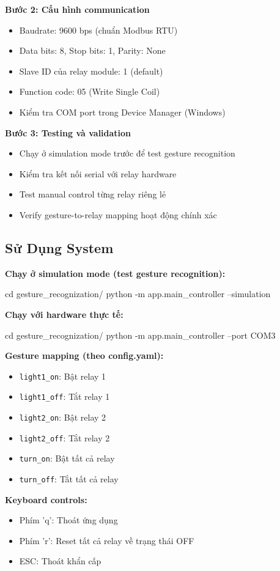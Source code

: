 \textbf{Bước 2: Cấu hình communication}
\begin{itemize}
    \item Baudrate: 9600 bps (chuẩn Modbus RTU)
    \item Data bits: 8, Stop bits: 1, Parity: None
    \item Slave ID của relay module: 1 (default)
    \item Function code: 05 (Write Single Coil)
    \item Kiểm tra COM port trong Device Manager (Windows)
\end{itemize}

\textbf{Bước 3: Testing và validation}
\begin{itemize}
    \item Chạy ở simulation mode trước để test gesture recognition
    \item Kiểm tra kết nối serial với relay hardware
    \item Test manual control từng relay riêng lẻ
    \item Verify gesture-to-relay mapping hoạt động chính xác
\end{itemize}

\subsection{Sử Dụng System}

\textbf{Chạy ở simulation mode (test gesture recognition):}
\begin{aivncodebox}
\begin{python}
cd gesture_recognization/
python -m app.main_controller --simulation
\end{python}
\end{aivncodebox}

\textbf{Chạy với hardware thực tế:}
\begin{aivncodebox}
\begin{python}
cd gesture_recognization/
python -m app.main_controller --port COM3
\end{python}
\end{aivncodebox}

\textbf{Gesture mapping (theo config.yaml):}
\begin{itemize}
    \item \texttt{light1\_on}: Bật relay 1
    \item \texttt{light1\_off}: Tắt relay 1
    \item \texttt{light2\_on}: Bật relay 2
    \item \texttt{light2\_off}: Tắt relay 2
    \item \texttt{turn\_on}: Bật tất cả relay
    \item \texttt{turn\_off}: Tắt tất cả relay
\end{itemize}

\textbf{Keyboard controls:}
\begin{itemize}
    \item Phím 'q': Thoát ứng dụng
    \item Phím 'r': Reset tất cả relay về trạng thái OFF
    \item ESC: Thoát khẩn cấp
\end{itemize}
